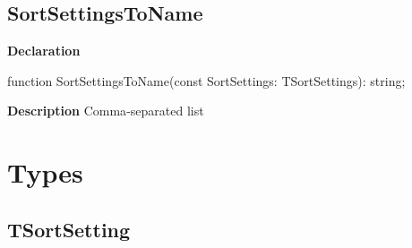 \documentclass{report}
\newif\ifpdf
\begin{document}
\subsection*{SortSettingsToName}
\fi
\label{PasDoc_SortSettings-SortSettingsToName}
\begin{list}{}{
\setlength{\itemindent}{0cm}
\setlength{\listparindent}{0cm}
\setlength{\leftmargin}{\evensidemargin}
\addtolength{\leftmargin}{\tmplength}
\settowidth{\labelsep}{X}
\addtolength{\leftmargin}{\labelsep}
\setlength{\labelwidth}{\tmplength}
}
\item[\textbf{Declaration}\hfill]
\ifpdf
\begin{flushleft}
\fi
\begin{ttfamily}
function SortSettingsToName(const SortSettings: TSortSettings): string;\end{ttfamily}

\ifpdf
\end{flushleft}
\fi

\par
\item[\textbf{Description}]
Comma{-}separated list

\end{list}
\section{Types}
\ifpdf
\subsection*{\large{\textbf{TSortSetting}}\normalsize\hspace{1ex}\hrulefill}
\else
\end{document}
